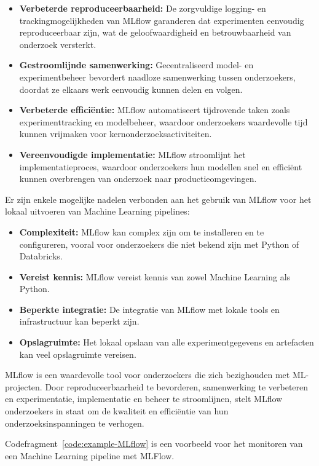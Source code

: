 \begin{itemize}
    \item \textbf{Verbeterde reproduceerbaarheid:} De zorgvuldige logging- en trackingmogelijkheden van MLflow garanderen dat experimenten eenvoudig reproduceerbaar zijn, wat de geloofwaardigheid en betrouwbaarheid van onderzoek versterkt.
    \item \textbf{Gestroomlijnde samenwerking:} Gecentraliseerd model- en experimentbeheer bevordert naadloze samenwerking tussen onderzoekers, doordat ze elkaars werk eenvoudig kunnen delen en volgen.
    \item \textbf{Verbeterde efficiëntie:} MLflow automatiseert tijdrovende taken zoals experimenttracking en modelbeheer, waardoor onderzoekers waardevolle tijd kunnen vrijmaken voor kernonderzoeksactiviteiten.
    \item \textbf{Vereenvoudigde implementatie:} MLflow stroomlijnt het implementatieproces, waardoor onderzoekers hun modellen snel en efficiënt kunnen overbrengen van onderzoek naar productieomgevingen.
\end{itemize}

Er zijn enkele mogelijke nadelen verbonden aan het gebruik van MLflow voor het lokaal uitvoeren van Machine Learning pipelines:

\begin{itemize}
    \item \textbf{Complexiteit:} MLflow kan complex zijn om te installeren en te configureren, vooral voor onderzoekers die niet bekend zijn met Python of Databricks.
    \item \textbf{Vereist kennis:} MLflow vereist kennis van zowel Machine Learning als Python.
    \item \textbf{Beperkte integratie:} De integratie van MLflow met lokale tools en infrastructuur kan beperkt zijn.
    \item \textbf{Opslagruimte:} Het lokaal opslaan van alle experimentgegevens en artefacten kan veel opslagruimte vereisen.
\end{itemize}
MLflow is een waardevolle tool voor onderzoekers die zich bezighouden met ML-projecten. Door reproduceerbaarheid te bevorderen, samenwerking te verbeteren en experimentatie, implementatie en beheer te stroomlijnen, stelt MLflow onderzoekers in staat om de kwaliteit en efficiëntie van hun onderzoeksinspanningen te verhogen.

Codefragment~\ref{code:example-MLflow} is een voorbeeld voor het monitoren van een Machine Learning pipeline met MLFlow.

